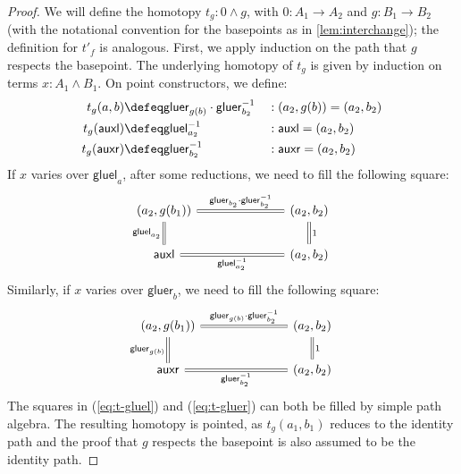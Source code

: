 \documentclass{article}
\newcommand{\smsh}{\wedge}
\newcommand{\tr}{\cdot}
\newcommand{\auxl}{\mathsf{auxl}}
\newcommand{\auxr}{\mathsf{auxr}}
\newcommand{\gluel}{\mathsf{gluel}}
\newcommand{\gluer}{\mathsf{gluer}}
\newcommand{\sy}{^{-1}}
\begin{document}
\begin{proof}
	We will define the homotopy $t_g : 0 \smsh g$, with $0 : A_1 \to A_2$ and $g : B_1 \to B_2$ (with the notational convention for the basepoints as in \autoref{lem:interchange}); the definition for $t'_f$ is analogous. First, we apply induction on the path that $g$ respects the basepoint. The underlying homotopy of $t_g$ is given by induction on terms $x : A_1 \smsh B_1$. On point constructors, we define:
	\begin{align*}
	t_g (a,b) &\defeq \gluer_{g(b)} \tr \gluer_{b_2}\sy && : (a_2, g(b)) = (a_2, b_2)\\
	t_g (\auxl) &\defeq \gluel_{a_2}\sy && : \auxl = (a_2, b_2)\\
	t_g (\auxr) &\defeq \gluer_{b_2}\sy && : \auxr = (a_2, b_2)
	\end{align*}
	If $x$ varies over $\gluel_a$, after some reductions, we need to fill the following square:
	\begin{equation}\label{eq:t-gluel}
	\begin{tikzcd}[column sep=7em]
		(a_2, g(b_1))
			\arrow[r,equals,"\gluer_{b_2} \tr \gluer_{b_2}\sy"]
			\arrow[d,swap,equals, "\gluel_{a_2}"]
		& (a_2, b_2)
			\arrow[d,equals,"1"]
		\\
		\auxl
			\arrow[r,swap,equals, "\gluel_{a_2}\sy"]
		& (a_2, b_2)
	\end{tikzcd}
	\end{equation}
	Similarly, if $x$ varies over $\gluer_b$, we need to fill the following square:
	\begin{equation}\label{eq:t-gluer}
	\begin{tikzcd}[column sep=7em]
		(a_2, g(b_1))
			\arrow[r,equals,"\gluer_{g(b)} \tr \gluer_{b_2}\sy"]
			\arrow[d,swap,equals, "\gluer_{g(b)}"]
		& (a_2, b_2)
			\arrow[d,equals,"1"]
		\\
		\auxr
			\arrow[r,swap,equals, "\gluer_{b_2}\sy"]
		& (a_2, b_2)
	\end{tikzcd}
	\end{equation}
	The squares in (\ref{eq:t-gluel}) and (\ref{eq:t-gluer}) can both be filled by simple path algebra. The resulting homotopy is pointed, as $t_g(a_1,b_1)$ reduces to the identity path and the proof that $g$ respects the basepoint is also assumed to be the identity path.
\end{proof}
\end{document}
